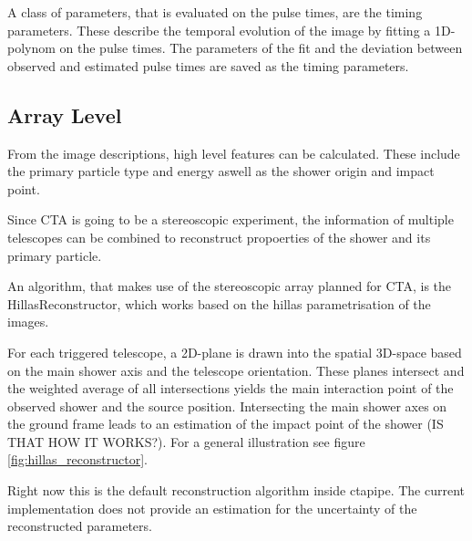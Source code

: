 A class of parameters, that is evaluated on the pulse times, are the timing
parameters. These describe the temporal evolution of the image by fitting
a 1D-polynom on the pulse times. The parameters of the fit and the deviation
between observed and estimated pulse times are saved as the timing parameters. 


\subsection{Array Level}
From the image descriptions, high level features can be calculated.
These include the primary particle type and energy aswell as 
the shower origin and impact point.

Since CTA is going to be a stereoscopic experiment,
the information of multiple telescopes can be combined to
reconstruct propoerties of the shower and its primary particle.

An algorithm, that makes use of the stereoscopic array planned for CTA,
is the HillasReconstructor, which works based on the hillas parametrisation
of the images.

For each triggered telescope, a 2D-plane is drawn into the spatial 3D-space based on the main shower 
axis and the telescope orientation. These planes intersect and 
the weighted average of all intersections yields the 
main interaction point of the observed shower and the source position.
Intersecting the main shower axes on the ground frame leads to 
an estimation of the impact point of the shower (IS THAT HOW IT WORKS?).
For a general illustration see figure \ref{fig:hillas_reconstructor}.

Right now this is the default reconstruction algorithm inside ctapipe.
The current implementation does not provide an 
estimation for the uncertainty of the reconstructed parameters.

